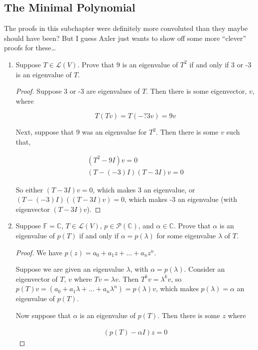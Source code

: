 \subsection{The Minimal Polynomial}

The proofs in this subchapter were definitely more convoluted than they maybe should have been? But I guess Axler just wants to show off some more ``clever'' proofs for these\dots

\begin{enumerate}
    \item[1] Suppose $T \in \mathcal L(V)$. Prove that 9 is an eigenvalue of $T^2$ if and only if 3 or -3 is an eigenvalue of $T$.
    
    \begin{proof}
        Suppose 3 or -3 are eigenvalues of $T$. Then there is some eigenvector, $v$, where

        $$T(Tv) = T(-?3v) = 9v$$

        Next, suppose that 9 was an eigenvalue for $T^2$. Then there is some $v$ such that, 

        \begin{align*}
            (T^2 - 9I)v = 0 \\
            (T - (-3)I)(T - 3I)v = 0 
        \end{align*}

        So either $(T - 3I)v = 0$, which makes 3 an eigenvalue, or $(T - (-3)I)((T - 3I)v) = 0$, which makes -3 an eigenvalue (with eigenvector $(T - 3I)v$).
    \end{proof}


\item[4] Suppose $\mathbb F = \mathbb C$, $T \in \mathcal L(V)$, $p \in \mathcal P(\mathbb C)$, and $\alpha \in \mathbb C$. Prove that $\alpha$ is an eigenvalue of $p(T)$ if and only if $\alpha = p(\lambda)$ for some eigenvalue $\lambda$ of $T$. 

\begin{proof}
We have $p(z) = a_0 + a_1z + \dots + a_nz^n$.

Suppose we are given an eigenvalue $\lambda$, with $\alpha = p(\lambda)$. Consider an eigenvector of $T$, $v$ where $Tv = \lambda v$. Then $T^kv = \lambda^k v$, so $p(T)v = (a_0 + a_1\lambda + \dots + a_n\lambda^n) = p(\lambda)v$, which makes $p(\lambda) = \alpha$ an eigenvalue of $p(T)$.

Now suppose that $\alpha$ is an eigenvalue of $p(T)$. Then there is some $z$ where 


\begin{align*}
(p(T) - \alpha I)z = 0
\end{align*}



\end{proof}
\end{enumerate}
